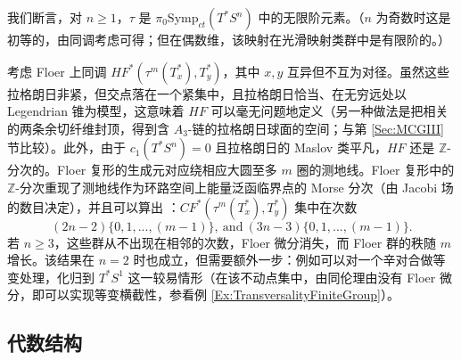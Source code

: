 \documentclass[11pt,a4paper]{article}
\numberwithin{equation}{section}
\newcommand{\bZ}{\mathbb{Z}}
\newcommand{\Symp}{\mathrm{Symp}}
\begin{document}
我们断言，对 $n\geq 1$，$\tau$ 是 $\pi_0\Symp_{ct}(T^*S^n)$ 中的无限阶元素。（$n$ 为奇数时这是初等的，由同调考虑可得；但在偶数维，该映射在光滑映射类群中是有限阶的。）

考虑 Floer 上同调 $HF^*(\tau^m (T_x^*), T_y^*)$，其中 $x, y$ 互异但不互为对径。虽然这些拉格朗日非紧，但交点落在一个紧集中，且拉格朗日恰当、在无穷远处以 Legendrian 锥为模型，这意味着 $HF$ 可以毫无问题地定义（另一种做法是把相关的两条余切纤维封顶，得到含 $A_3$-链的拉格朗日球面的空间；与第 \ref{Sec:MCGIII} 节比较）。此外，由于 $c_1(T^*S^n) = 0$ 且拉格朗日的 Maslov 类平凡，$HF$ 还是 $\bZ$-分次的。Floer 复形的生成元对应绕相应大圆至多 $m$ 圈的测地线。Floer 复形中的 $\bZ$-分次重现了测地线作为环路空间上能量泛函临界点的 Morse 分次（由 Jacobi 场的数目决定），并且可以算出 \cite{FrauSchlenk}：$CF^*(\tau^m (T_x^*), T_y^*)$ 集中在次数
\[
(2n-2) \{0,1,...,(m-1)\}, \ \mathrm{and} \ (3n-3)\{0,1,...,(m-1)\}.
\]
若 $n \geq 3$，这些群从不出现在相邻的次数，Floer 微分消失，而 Floer 群的秩随 $m$ 增长。该结果在 $n=2$ 时也成立，但需要额外一步：例如可以对一个辛对合做等变处理，化归到 $T^*S^1$ 这一较易情形（在该不动点集中，由同伦理由没有 Floer 微分，即可以实现等变横截性，参看例 \ref{Ex:TransversalityFiniteGroup}）。





\subsection{代数结构}
\end{document}
